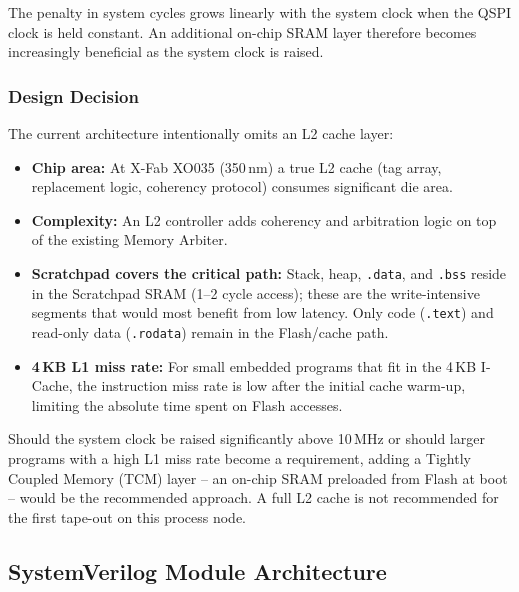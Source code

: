 The penalty in system cycles grows linearly with the system clock when
the QSPI clock is held constant.
An additional on-chip SRAM layer therefore becomes increasingly
beneficial as the system clock is raised.

\subsubsection{Design Decision}
\label{subsubsec:l2Decision}

The current architecture intentionally omits an L2 cache layer:

\begin{itemize}
  \item \textbf{Chip area:} At X-Fab XO035 (350\,nm) a true L2 cache
    (tag array, replacement logic, coherency protocol) consumes
    significant die area.
  \item \textbf{Complexity:} An L2 controller adds coherency and
    arbitration logic on top of the existing Memory Arbiter.
  \item \textbf{Scratchpad covers the critical path:}
    Stack, heap, \texttt{.data}, and \texttt{.bss} reside in the
    Scratchpad SRAM (1--2 cycle access); these are the write-intensive
    segments that would most benefit from low latency.
    Only code (\texttt{.text}) and read-only data (\texttt{.rodata})
    remain in the Flash/cache path.
  \item \textbf{4\,KB L1 miss rate:} For small embedded programs that
    fit in the 4\,KB I-Cache, the instruction miss rate is low after
    the initial cache warm-up, limiting the absolute time spent on
    Flash accesses.
\end{itemize}

Should the system clock be raised significantly above 10\,MHz or should
larger programs with a high L1 miss rate become a requirement, adding a
Tightly Coupled Memory (TCM) layer -- an on-chip SRAM preloaded from
Flash at boot -- would be the recommended approach.
A full L2 cache is not recommended for the first tape-out on this
process node.

\subsection{SystemVerilog Module Architecture}
\label{subsec:svModules}

